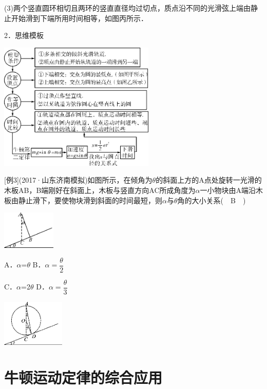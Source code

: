 \documentclass[cn,10.5pt,chinese,mac,chinesefont=founder]{elegantbook}
\begin{document}
(3)两个竖直圆环相切且两环的竖直直径均过切点，质点沿不同的光滑弦上端由静止开始滑到下端所用时间相等，如图丙所示．

2．思维模板

\begin{center}\includegraphics[width=2.92708in,height=2.39583in]{media/image108.png}\end{center}

{[}例3{]}(2017·山东济南模拟)如图所示，在倾角为$\theta$的斜面上方的A点处旋转一光滑的木板AB，B端刚好在斜面上，木板与竖直方向AC所成角度为$\alpha$一小物块由A端沿木板由静止滑下，要使物块滑到斜面的时间最短，则$\alpha$与$\theta$角的大小关系(　B　)

\begin{center}\includegraphics[width=1in,height=0.71875in]{media/image109.png}\end{center}

A．$\alpha$=$\theta$ B．$\alpha=\dfrac{\theta}{2}$

C．$\alpha$=2$\theta$ D．$\alpha=\dfrac{\theta}{3}$

\begin{center}\includegraphics[width=1.17708in,height=0.875in]{media/image110.png}\end{center}
\newpage
\section{牛顿运动定律的综合应用}
\end{document}
